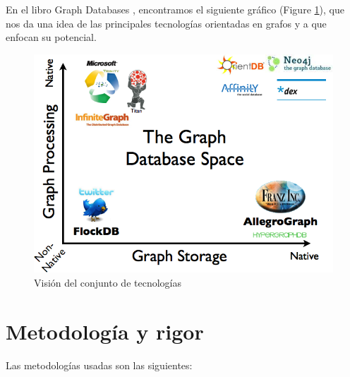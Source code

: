 \documentclass[12pt]{article} %
\begin{document}
En el libro Graph Databases \cite{graphdbbook}, encontramos el siguiente gráfico (Figure \ref{fig:grdb}), que nos da una idea de las principales tecnologías orientadas en grafos y a que enfocan su potencial.

\begin{figure}[ht!]
\center
\includegraphics{grdb.png}
\caption{Visión del conjunto de tecnologías}
\label{fig:grdb}
\end{figure}

\newpage
\section{Metodología y rigor}

Las metodologías usadas son las siguientes:
\end{document}
